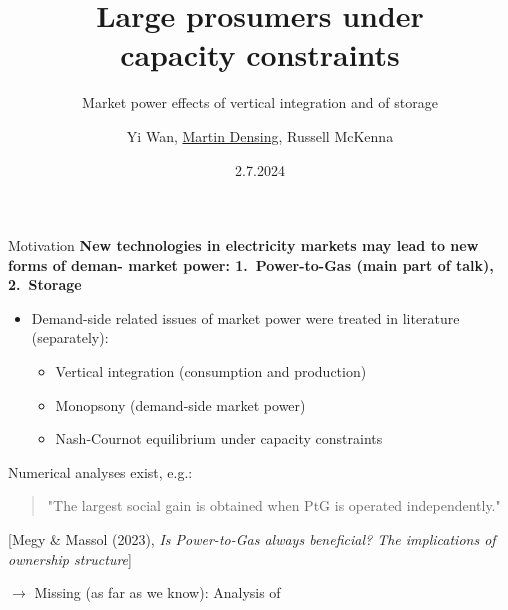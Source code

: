 \documentclass[aspectratio=169,t]{beamer}  %
\title[Large prosumers: Vertical integration and storage]{Large prosumers under \\ capacity constraints}
\subtitle{Market power effects of vertical integration and of storage}
\author[Wan, Densing, McKenna]{Yi Wan, \underline{Martin Densing}, Russell McKenna}
\date{2.7.2024}
\institute{EURO 2024, Copenhagen}
\begin{document}
\begin{frame}[plain,c] %
 \titlepage
\end{frame}


\begin{frame}{Motivation}
\textbf{New technologies in electricity markets may lead to new forms of deman- market power: 1.~Power-to-Gas (main part of talk), 2.~Storage}
\begin{itemize}
\item Demand-side related issues of market power were treated in literature (separately):
\vspace{-2ex}
\begin{itemize} 
    \item Vertical integration (consumption and production) 
    \item Monopsony (demand-side market power)
    \item Nash-Cournot equilibrium under capacity constraints  
\end{itemize}  
\end{itemize}
\medskip
\begin{itemize}
\item Numerical analyses exist, e.g.:
\begin{quote}
\item  "The largest social gain is obtained when PtG is operated independently."
\end{quote}
[Megy \& Massol (2023), \textit{Is Power-to-Gas always beneficial? The implications of ownership structure}]
\end{itemize}
\medskip
 $\rightarrow$ Missing (as far as we know): Analysis of 
\end{frame}
\end{document}
